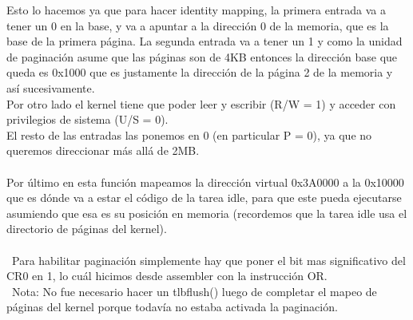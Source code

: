 Esto lo hacemos ya que para hacer identity mapping, la primera entrada va a tener un 0 en la base, y va a apuntar a la dirección 0 de la memoria, que es la base de la primera página. La segunda entrada va a tener un 1 y como la unidad de paginación asume que las páginas son de 4KB entonces la dirección base que queda es 0x1000 que es justamente la dirección de la página 2 de la memoria y así sucesivamente.\\
Por otro lado el kernel tiene que poder leer y escribir (R/W = 1) y acceder con privilegios de sistema (U/S = 0).\\
El resto de las entradas las ponemos en 0 (en particular P = 0), ya que no queremos direccionar más allá de 2MB.\\\
\\
Por último en esta función mapeamos la dirección virtual 0x3A0000 a la 0x10000 que es dónde va a estar el código de la tarea idle, para que este pueda ejecutarse asumiendo que esa es su posición en memoria (recordemos que la tarea idle usa el directorio de páginas del kernel).\\
\\\
Para habilitar paginación simplemente hay que poner el bit mas significativo del CR0 en 1, lo cuál hicimos desde assembler con la instrucción OR.\\\
Nota: No fue necesario hacer un tlbflush() luego de completar el mapeo de páginas del kernel porque todavía no estaba activada la paginación.